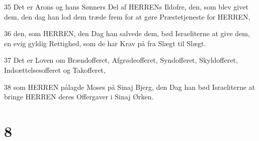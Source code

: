 \par 35 Det er Arons og hans Sønners Del af HERRENs Ildofre, den, som blev givet dem, den dag han lod dem træde frem for at gøre Præstetjeneste for HERREN,
\par 36 den, som HERREN, den Dag han salvede dem, bød Israeliterne at give dem, en evig gyldig Rettighed, som de har Krav på fra Slægt til Slægt.
\par 37 Det er Loven om Brændofferet, Afgrødeofferet, Syndofferet, Skyldofferet, Indsættelsesofferet og Takofferet,
\par 38 som HERREN pålagde Moses på Sinaj Bjerg, den Dag han bød Israeliterne at bringe HERREN deres Offergaver i Sinaj Ørken.

\chapter{8}

